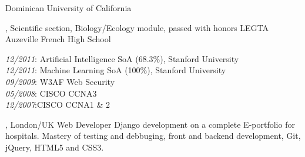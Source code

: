 \documentclass[english]{ecv}
\makeatletter
\renewcommand{\ecvBSec}[2][\ecv@lang]{%
  \ifthenelse{\equal{#1}{\ecv@lang}}{%
    \tabularnewline%
    \ecvLeft{\textsc{\Large{\textcolor{ecv@ColBlue}{#2}}} \medskip } &%
    \tabularnewline%
  }{}%
}
\makeatother
\begin{document}
\begin{ecv}
                {}
                {Dominican University of California}

                {, Scientific section, Biology/Ecology
                module, passed with honors}
                {LEGTA Auzeville French High School}

\ecvENR{}
                {\textit{12/2011}: Artificial Intelligence SoA (68.3\%), Stanford University\\
                \textit{12/2011}: Machine Learning  SoA (100\%), Stanford University\\
                \textit{09/2009}: W3AF Web Security\\
                \textit{05/2008}: CISCO CCNA3\\
                \textit{12/2007}:CISCO CCNA1 \& 2}

             

             


\ecvPageBreak

\ecvBSec{\hypertarget{hypertarget:\ecvJobs}{\ecvJobs}}

                 {, London/UK}
                 {Web Developer}
                 {Django development on a complete E-portfolio for hospitals.
                   Mastery of testing and debbuging, front and backend
                   development, Git, jQuery, HTML5 and CSS3.
                 }


\end{ecv}
\end{document}
